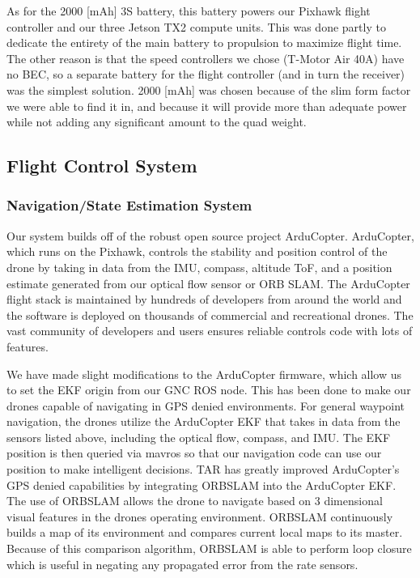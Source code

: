 \documentclass[12pt,letterpaper]{article}
\begin{document}
As for the 2000 [mAh] 3S battery, this battery powers our Pixhawk flight controller and our three Jetson TX2 compute units. This was done partly to dedicate the entirety of the main battery to propulsion to maximize flight time. The other reason is that the speed controllers we chose (T-Motor Air 40A) have no BEC, so a separate battery for the flight controller (and in turn the receiver) was the simplest solution. 2000 [mAh] was chosen because of the slim form factor we were able to find it in, and because it will provide more than adequate power while not adding any significant amount to the quad weight.

	\subsection*{Flight Control System}
		\subsubsection*{Navigation/State Estimation System}

			Our system builds off of the robust open source project ArduCopter. ArduCopter, which runs on the Pixhawk, controls the stability and position control of the drone by taking in data from the IMU, compass, altitude ToF, and a position estimate generated from our optical flow sensor or ORB SLAM. The ArduCopter flight stack is maintained by hundreds of developers from around the world and the software is deployed on thousands of commercial and recreational drones. The vast community of developers and users ensures reliable controls code with lots of features.

			We have made slight modifications to the ArduCopter firmware, which allow us to set the EKF origin from our GNC ROS node. This has been done to make our drones capable of navigating in GPS denied environments. For general waypoint navigation, the drones utilize the ArduCopter EKF that takes in data from the sensors listed above, including the optical flow, compass, and IMU. The EKF position is then queried via mavros so that our navigation code can use our position to make intelligent decisions. TAR has greatly improved ArduCopter’s GPS denied capabilities by integrating ORBSLAM into the ArduCopter EKF. The use of ORBSLAM allows the drone to navigate based on 3 dimensional visual features in the drones operating environment. ORBSLAM continuously builds a map of its environment and compares current local maps to its master. Because of this comparison algorithm, ORBSLAM is able to perform loop closure which is useful in negating any propagated error from the rate sensors.
\end{document}
